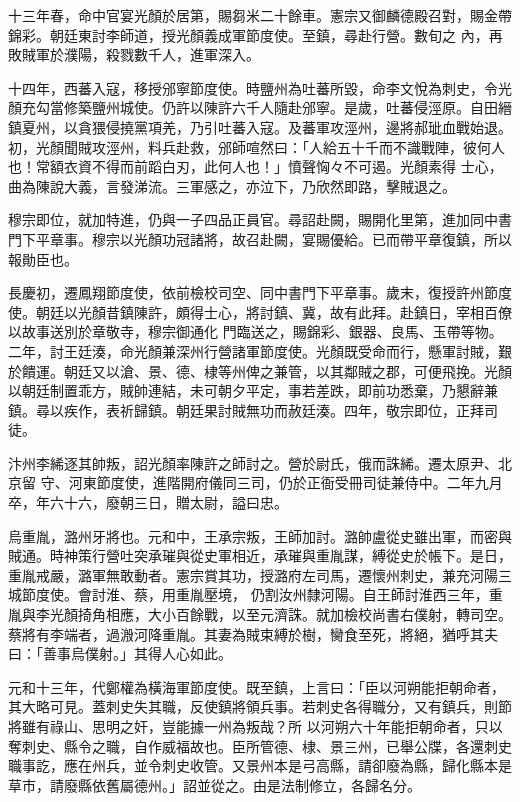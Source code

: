 \begin{pinyinscope}
 十三年春，命中官宴光顏於居第，賜芻米二十餘車。憲宗又御麟德殿召對，賜金帶錦彩。朝廷東討李師道，授光顏義成軍節度使。至鎮，尋赴行營。數旬之
 內，再敗賊軍於濮陽，殺戮數千人，進軍深入。



 十四年，西蕃入寇，移授邠寧節度使。時鹽州為吐蕃所毀，命李文悅為刺史，令光顏充勾當修築鹽州城使。仍許以陳許六千人隨赴邠寧。是歲，吐蕃侵涇原。自田縉鎮夏州，以貪猥侵撓黨項羌，乃引吐蕃入寇。及蕃軍攻涇州，邊將郝玼血戰始退。初，光顏聞賊攻涇州，料兵赴救，邠師喧然曰：「人給五十千而不識戰陣，彼何人也！常額衣資不得而前蹈白刃，此何人也！」憤聲恟々不可遏。光顏素得
 士心，曲為陳說大義，言發涕流。三軍感之，亦泣下，乃欣然即路，擊賊退之。



 穆宗即位，就加特進，仍與一子四品正員官。尋詔赴闕，賜開化里第，進加同中書門下平章事。穆宗以光顏功冠諸將，故召赴闕，宴賜優給。已而帶平章復鎮，所以報勛臣也。



 長慶初，遷鳳翔節度使，依前檢校司空、同中書門下平章事。歲末，復授許州節度使。朝廷以光顏昔鎮陳許，頗得士心，將討鎮、冀，故有此拜。赴鎮日，宰相百僚以故事送別於章敬寺，穆宗御通化
 門臨送之，賜錦彩、銀器、良馬、玉帶等物。二年，討王廷湊，命光顏兼深州行營諸軍節度使。光顏既受命而行，懸軍討賊，艱於饋運。朝廷又以滄、景、德、棣等州俾之兼管，以其鄰賊之郡，可便飛挽。光顏以朝廷制置乖方，賊帥連結，未可朝夕平定，事若差跌，即前功悉棄，乃懇辭兼鎮。尋以疾作，表祈歸鎮。朝廷果討賊無功而赦廷湊。四年，敬宗即位，正拜司徒。



 汴州李絺逐其帥叛，詔光顏率陳許之師討之。營於尉氏，俄而誅絺。遷太原尹、北京留
 守、河東節度使，進階開府儀同三司，仍於正衙受冊司徒兼侍中。二年九月卒，年六十六，廢朝三日，贈太尉，謚曰忠。



 烏重胤，潞州牙將也。元和中，王承宗叛，王師加討。潞帥盧從史雖出軍，而密與賊通。時神策行營吐突承璀與從史軍相近，承璀與重胤謀，縛從史於帳下。是日，重胤戒嚴，潞軍無敢動者。憲宗賞其功，授潞府左司馬，遷懷州刺史，兼充河陽三城節度使。會討淮、蔡，用重胤壓境，
 仍割汝州隸河陽。自王師討淮西三年，重胤與李光顏掎角相應，大小百餘戰，以至元濟誅。就加檢校尚書右僕射，轉司空。蔡將有李端者，過溵河降重胤。其妻為賊束縛於樹，臠食至死，將絕，猶呼其夫曰：「善事烏僕射。」其得人心如此。



 元和十三年，代鄭權為橫海軍節度使。既至鎮，上言曰：「臣以河朔能拒朝命者，其大略可見。蓋刺史失其職，反使鎮將領兵事。若刺史各得職分，又有鎮兵，則節將雖有祿山、思明之奸，豈能據一州為叛哉？所
 以河朔六十年能拒朝命者，只以奪刺史、縣令之職，自作威福故也。臣所管德、棣、景三州，已舉公牒，各還刺史職事訖，應在州兵，並令刺史收管。又景州本是弓高縣，請卻廢為縣，歸化縣本是草市，請廢縣依舊屬德州。」詔並從之。由是法制修立，各歸名分。




\end{pinyinscope}
